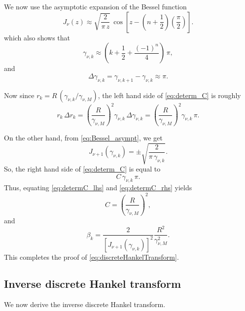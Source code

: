 \documentclass[preprint]{revtex4-1}
\numberwithin{equation}{subsection}
\numberwithin{table}{section}
\begin{document}
We now use the asymptotic expansion of the Bessel function\cite{arfken}
\begin{equation}
  J_\nu(z)
\approx
  \sqrt{ \frac{ 2 } { \pi \, z } } \,
  \cos\left[
    z - \left(
        n + \frac 1 2
        \right)
        \left(
          \frac \pi 2
        \right)
  \right].
  \label{eq:Bessel_asympt}
\end{equation}
%
which also shows that
%
\begin{equation}
  \gamma_{\nu, k}
\approx
  \left(
    k + \frac 1 2 + \frac{(-1)^n}{4}
  \right)
  \, \pi,
  \label{eq:BesselZero_asympt}
\end{equation}
%
and
%
\begin{equation}
  \Delta \gamma_{\nu, k}
=
  \gamma_{\nu, k + 1} - \gamma_{\nu, k}
\approx
  \pi.
  \label{eq:BesseldZero_asympt}
\end{equation}


Now since $r_k = R \, \left( \gamma_{\nu, k}/\gamma_{\nu, M} \right)$,
the left hand side of \eqref{eq:determ_C} is roughly
\begin{equation}
  r_k \, \Delta r_k
=
  \left( \frac{ R } { \gamma_{\nu, M} } \right)^2
  \gamma_{\nu, k} \, \Delta \gamma_{\nu, k}
=
  \left( \frac{ R } { \gamma_{\nu, M} } \right)^2
  \gamma_{\nu, k} \, \pi.
  \label{eq:determC_lhs}
\end{equation}


On the other hand, from \eqref{eq:Bessel_asympt}, we get
\[
  J_{\nu+1}(\gamma_{\nu, k})
=
  \pm \sqrt{
    \frac{ 2 }
    { \pi \, \gamma_{\nu, k} }
  }.
\]
So, the right hand side of \eqref{eq:determ_C} is equal to
\begin{equation}
  C \, \gamma_{\nu, k} \, \pi.
  \label{eq:determC_rhs}
\end{equation}
Thus, equating \eqref{eq:determC_lhs} and \eqref{eq:determC_rhs} yields
\[
  C = \left( \frac{ R } { \gamma_{\nu, M} } \right)^2,
\]
and
\[
  \beta_k
=
  \frac{ 2 }
  { [ J_{\nu + 1}(\gamma_{\nu, k}) ]^2 }
  \frac{ R^2 }
  { \gamma^2_{\nu, M} }.
\]
This completes the proof of \eqref{eq:discreteHankelTransform}.





\subsection{Inverse discrete Hankel transform}

We now derive the inverse discrete Hankel transform.
\end{document}
